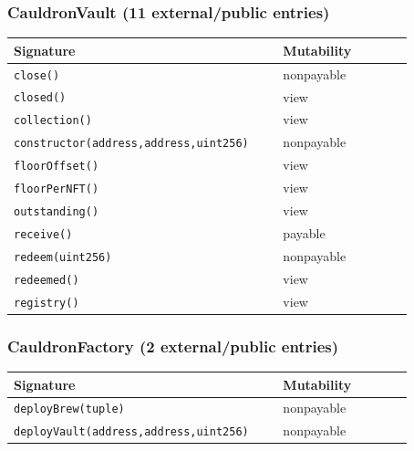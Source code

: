 \subsubsection*{CauldronVault \;\normalfont\small(11 external/public entries)}
\begin{longtable}{@{}p{0.62\linewidth}p{0.30\linewidth}@{}}
\toprule \textbf{Signature} & \textbf{Mutability} \\ \midrule \endhead
\texttt{\scriptsize close()} & nonpayable \\
\texttt{\scriptsize closed()} & view \\
\texttt{\scriptsize collection()} & view \\
\texttt{\scriptsize constructor(address,address,uint256)} & nonpayable \\
\texttt{\scriptsize floorOffset()} & view \\
\texttt{\scriptsize floorPerNFT()} & view \\
\texttt{\scriptsize outstanding()} & view \\
\texttt{\scriptsize receive()} & payable \\
\texttt{\scriptsize redeem(uint256)} & nonpayable \\
\texttt{\scriptsize redeemed()} & view \\
\texttt{\scriptsize registry()} & view \\
\bottomrule\end{longtable}

\subsubsection*{CauldronFactory \;\normalfont\small(2 external/public entries)}
\begin{longtable}{@{}p{0.62\linewidth}p{0.30\linewidth}@{}}
\toprule \textbf{Signature} & \textbf{Mutability} \\ \midrule \endhead
\texttt{\scriptsize deployBrew(tuple)} & nonpayable \\
\texttt{\scriptsize deployVault(address,address,uint256)} & nonpayable \\
\bottomrule\end{longtable}

